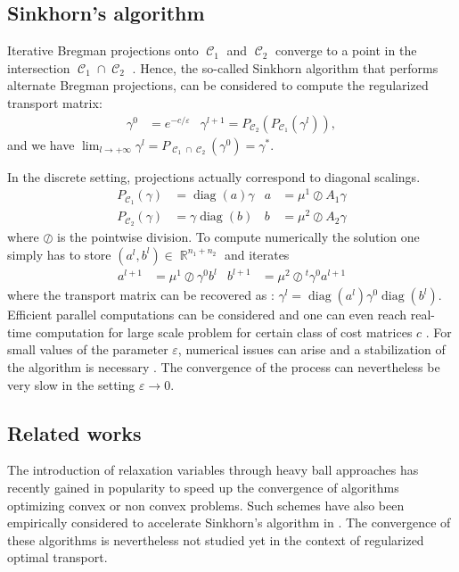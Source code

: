 \documentclass{article} %
\DeclareMathOperator{\IR}{\mathbb{R}}
\DeclareMathOperator{\Ccal}{\mathcal{C}}
\DeclareMathOperator{\diag}{diag}
\renewcommand{\epsilon}{\varepsilon}
\theoremstyle{plain}
\theoremstyle{definition}
\theoremstyle{remark}
\begin{document}
\subsection{Sinkhorn's algorithm}
Iterative Bregman projections onto $\Ccal_1$ and $\Ccal_2$ converge to a point in the intersection $\Ccal_1 \cap \Ccal_2$ \cite{bregman67}. Hence, the so-called Sinkhorn algorithm \cite{sinkhorn64} that performs alternate Bregman projections, can be considered to compute the regularized  transport matrix:
\begin{align*}
\gamma^0 &= e^{-c/\epsilon} &
\gamma^{l+1} = P_{\Ccal_2}(P_{\Ccal_1}(\gamma^l)),
\end{align*}
and we have 
$\lim_{l\rightarrow +\infty} \gamma^l = P_{\Ccal_1 \cap \Ccal_2}(\gamma^0) = \gamma^*.$

In the discrete setting,  projections actually correspond to diagonal scalings.
\begin{align}\label{scaling}
P_{\Ccal_1}(\gamma) &= \diag(a) \gamma &
a &=  {\mu^1}\oslash{A_1 \gamma} \\
P_{\Ccal_2}(\gamma) &= \gamma \diag(b) &
b &= {\mu^2}\oslash{A_2 \gamma}\nonumber
\end{align}
where $\oslash$ is the pointwise division. 
To compute numerically the solution  one simply has to store $(a^l, b^l)\in\IR^{n_1+n_2}$ and iterates
\begin{align*}
a^{l+1} &= {\mu^1}\oslash{\gamma^0 b^l} &
b^{l+1} &= {\mu^2}\oslash{^t \gamma^0 a^{l+1}} 
\end{align*}
where the transport matrix can be recovered as :
$\gamma^l = \diag(a^l) \gamma^0 \diag(b^l).$ 
Efficient parallel computations can be considered \cite{cuturi13} and one can even reach real-time computation for large scale problem for certain class of cost matrices $c$ \cite{Solomon2015}. 
For small values of the parameter $\epsilon$, numerical issues can arise and a stabilization of the algorithm is necessary \cite{2016arXiv160705816C}.
The convergence of the process can nevertheless be very slow  in the setting $\epsilon\to 0$.
\subsection{Related works }
The introduction of relaxation variables through heavy ball approaches \cite{POLYAK19641} has recently gained in popularity  to speed up the convergence of algorithms optimizing convex \cite{2014arXiv1412.7457G} or non convex \cite{Zavriev1993,2016arXiv160609070O} problems. Such schemes have also been empirically considered to accelerate Sinkhorn's algorithm  in \cite{peyre2016quantum,2017arXiv170801955S}. The convergence of these algorithms is nevertheless not studied yet in the context of regularized optimal transport.
\end{document}

